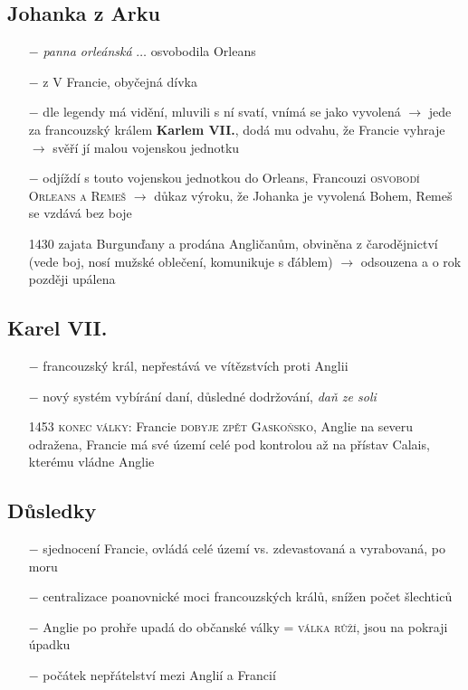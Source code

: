 \documentclass{article}
\begin{document}
\subsection*{Johanka z Arku}
\begin{itemize}
    \vspace{-0.5em}
    \setlength\itemsep{0.15em}
    \item[$-$] \textit{panna orleánská} $\dots$ osvobodila Orleans
    \item[$-$] z V Francie, obyčejná dívka
    \item[$-$] dle legendy má vidění, mluvili s ní svatí, vnímá se jako vyvolená $\rightarrow$ jede za francouzský králem \textbf{Karlem VII.}, dodá mu odvahu, že Francie vyhraje $\rightarrow$ svěří jí malou vojenskou jednotku
    \item[$-$] odjíždí s touto vojenskou jednotkou do Orleans, Francouzi \textsc{osvobodí Orleans a Remeš} $\rightarrow$ důkaz výroku, že Johanka je vyvolená Bohem, Remeš se vzdává bez boje
    \item[1430] zajata Burgunďany a prodána Angličanům, obviněna z čarodějnictví (vede boj, nosí mužské oblečení, komunikuje s ďáblem) $\rightarrow$ odsouzena a o rok později upálena
\end{itemize}

\subsection*{Karel VII.}
\begin{itemize}
    \vspace{-0.5em}
    \setlength\itemsep{0.15em}
    \item[$-$] francouzský král, nepřestává ve vítězstvích proti Anglii
    \item[$-$] nový systém vybírání daní, důsledné dodržování, \textit{daň ze soli}
    \item[1453] \textsc{konec války}: Francie \textsc{dobyje zpět Gaskoňsko}, Anglie na severu odražena, Francie má své území celé pod kontrolou až na přístav Calais, kterému vládne Anglie
\end{itemize}

\subsection*{Důsledky}
\begin{itemize}
    \vspace{-0.5em}
    \setlength\itemsep{0.15em}
    \item[$-$] sjednocení Francie, ovládá celé území vs. zdevastovaná a vyrabovaná, po moru
    \item[$-$] centralizace poanovnické moci francouzských králů, snížen počet šlechticů
    \item[$-$] Anglie po prohře upadá do občanské války = \textsc{válka růží}, jsou na pokraji úpadku
    \item[$-$] počátek nepřátelství mezi Anglií a Francií
\end{itemize}
\end{document}
